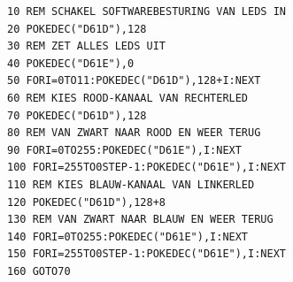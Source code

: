 \begin{tcolorbox}[colback=black,coltext=white]
\verbatimfont{\codefont}
\begin{verbatim}
10 REM SCHAKEL SOFTWAREBESTURING VAN LEDS IN
20 POKEDEC("D61D"),128
30 REM ZET ALLES LEDS UIT
40 POKEDEC("D61E"),0
50 FORI=0TO11:POKEDEC("D61D"),128+I:NEXT
60 REM KIES ROOD-KANAAL VAN RECHTERLED
70 POKEDEC("D61D"),128
80 REM VAN ZWART NAAR ROOD EN WEER TERUG
90 FORI=0TO255:POKEDEC("D61E"),I:NEXT
100 FORI=255TO0STEP-1:POKEDEC("D61E"),I:NEXT
110 REM KIES BLAUW-KANAAL VAN LINKERLED
120 POKEDEC("D61D"),128+8
130 REM VAN ZWART NAAR BLAUW EN WEER TERUG
140 FORI=0TO255:POKEDEC("D61E"),I:NEXT
150 FORI=255TO0STEP-1:POKEDEC("D61E"),I:NEXT
160 GOTO70
\end{verbatim}
\end{tcolorbox}
